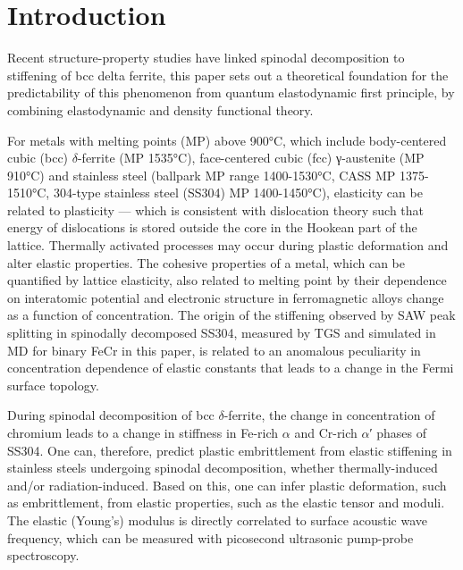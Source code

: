 

\section{Introduction}
Recent structure-property studies have linked spinodal decomposition to stiffening of bcc delta ferrite, \cite{al2023detecting, al2020detecting,al2020non} this paper sets out a theoretical foundation for the predictability of this phenomenon from quantum elastodynamic first principle, by combining elastodynamic and density functional theory. 


For metals with melting points (MP) above 900°C, which include body-centered cubic (bcc) $\delta$-ferrite (MP 1535°C), face-centered cubic (fcc) γ-austenite (MP 910°C) and stainless steel (ballpark MP range 1400-1530°C, CASS MP 1375-1510°C, 304-type stainless steel (SS304) MP 1400-1450°C), elasticity can be related to plasticity — which is consistent with dislocation theory such that energy of dislocations is stored outside the core in the Hookean part of the lattice. Thermally activated processes may occur during plastic deformation and alter elastic properties. \cite{pugh1954xcii} The cohesive properties of a metal, which can be quantified by lattice elasticity, also related to melting point by their dependence on interatomic potential and electronic structure \cite{chang1966correlation,fine1984elastic, korzhavyi2009electronic, razumovskiy2011first, hosemann2018materials} in ferromagnetic alloys change as a function of concentration. \cite{korzhavyi2009electronic} The origin of the stiffening observed by SAW peak splitting in spinodally decomposed SS304, measured by TGS and simulated in MD for binary FeCr in this paper, is related to an anomalous peculiarity in concentration dependence of elastic constants that leads to a change in the Fermi surface topology. \cite{razumovskiy2011first}

During spinodal decomposition of bcc $\delta$-ferrite, the change in concentration of chromium leads to a change in stiffness in Fe-rich $\alpha$ and Cr-rich $\alpha$′ phases of SS304. One can, therefore, predict plastic embrittlement from elastic stiffening \cite{du2017facile, sdajani2019cassspinodal,al2020non, hofmann2019transient, al2020detecting} in stainless steels undergoing spinodal decomposition, whether thermally-induced and/or radiation-induced. \cite{byun2016thermal,lach2020precipitation} Based on this, one can infer plastic deformation, such as embrittlement, from elastic properties, such as the elastic tensor and moduli. The elastic (Young’s) modulus is directly correlated to surface acoustic wave frequency, which can be measured with picosecond ultrasonic pump-probe spectroscopy. \cite{hofmann2019transient}



